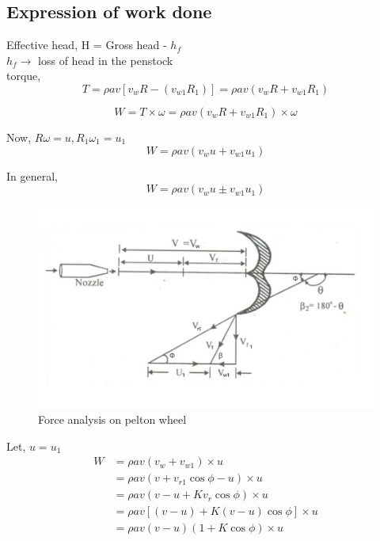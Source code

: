 \documentclass{article}
\begin{document}
\subsection*{Expression of work done}
Effective head, H = Gross head - $h_f$ \\
$h_f \rightarrow$ loss of head in the penstock\\ 

torque,
$$T = \rho a v \left[v_w R - (v_{w1} R_1)\right] = \rho a v \left(v_w R + v_{w1}R_1 \right)$$

$$W = T \times \omega = \rho a v \left(v_w R + v_{w1} R_1\right) \times \omega $$

Now, $R \omega = u, R_1 \omega_1 = u_1$
$$W = \rho a v \left(v_w u + v_{w1} u_1\right) $$

In general,
\begin{equation}
  W = \rho a v \left(v_w u \pm v_{w1} u_1\right) \label{eq:eq33}
\end{equation}

\begin{figure}[h]
  \begin{center}
    \includegraphics*[width=0.8\linewidth]{img/pelton_force.jpeg}
    \caption{Force analysis on pelton wheel}
  \end{center}
\end{figure}

Let, $u=u_1$
\begin{align*}
  W &= \rho a v \left(v_w + v_{w1} \right) \times u \\
  &= \rho a v \left(v + v_{r1} \cos \phi - u \right) \times u \\
  &= \rho a v \left(v - u + K v_{r} \cos \phi \right) \times u \\
  &= \rho a v \left[(v - u) + K (v-u) \cos \phi \right] \times u \\
  &= \rho a v (v - u)(1 + K  \cos \phi)  \times u 
\end{align*}
\end{document}

